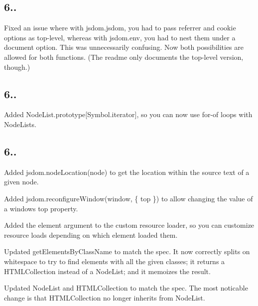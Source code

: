 \subsection*{6..}


\begin{DoxyItemize}
\item Fixed an issue where with {\ttfamily jsdom.\+jsdom}, you had to pass {\ttfamily referrer} and {\ttfamily cookie} options as top-\/level, whereas with {\ttfamily jsdom.\+env}, you had to nest them under a {\ttfamily document} option. This was unnecessarily confusing. Now both possibilities are allowed for both functions. (The readme only documents the top-\/level version, though.)
\end{DoxyItemize}

\subsection*{6..}


\begin{DoxyItemize}
\item Added {\ttfamily Node\+List.\+prototype\mbox{[}Symbol.\+iterator\mbox{]}}, so you can now use {\ttfamily for}-\/{\ttfamily of} loops with {\ttfamily Node\+List}s.
\end{DoxyItemize}

\subsection*{6..}


\begin{DoxyItemize}
\item Added {\ttfamily jsdom.\+node\+Location(node)} to get the location within the source text of a given node.
\item Added {\ttfamily jsdom.\+reconfigure\+Window(window, \{ top \})} to allow changing the value of a window\textquotesingle{}s {\ttfamily top} property.
\item Added the {\ttfamily element} argument to the custom resource loader, so you can customize resource loads depending on which element loaded them.
\item Updated {\ttfamily get\+Elements\+By\+Class\+Name} to match the spec. It now correctly splits on whitespace to try to find elements with all the given classes; it returns a {\ttfamily H\+T\+M\+L\+Collection} instead of a {\ttfamily Node\+List}; and it memoizes the result.
\item Updated {\ttfamily Node\+List} and {\ttfamily H\+T\+M\+L\+Collection} to match the spec. The most noticable change is that {\ttfamily H\+T\+M\+L\+Collection} no longer inherits from {\ttfamily Node\+List}.
\end{DoxyItemize}

